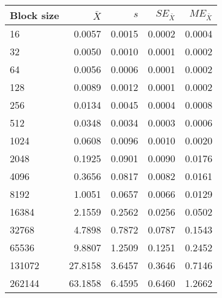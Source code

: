 \begin{tabular}{lrrrr}\toprule
{\small Block size} & $\bar{X}$ & $s$ & $SE_{\bar{X}}$ & $ME_{\bar{X}}$ \\\midrule
16 & 0.0057 & 0.0015 & 0.0002 & 0.0004\\
32 & 0.0050 & 0.0010 & 0.0001 & 0.0002\\
64 & 0.0056 & 0.0006 & 0.0001 & 0.0002\\
128 & 0.0089 & 0.0012 & 0.0001 & 0.0002\\
256 & 0.0134 & 0.0045 & 0.0004 & 0.0008\\
512 & 0.0348 & 0.0034 & 0.0003 & 0.0006\\
1024 & 0.0608 & 0.0096 & 0.0010 & 0.0020\\
2048 & 0.1925 & 0.0901 & 0.0090 & 0.0176\\
4096 & 0.3656 & 0.0817 & 0.0082 & 0.0161\\
8192 & 1.0051 & 0.0657 & 0.0066 & 0.0129\\
16384 & 2.1559 & 0.2562 & 0.0256 & 0.0502\\
32768 & 4.7898 & 0.7872 & 0.0787 & 0.1543\\
65536 & 9.8807 & 1.2509 & 0.1251 & 0.2452\\
131072 & 27.8158 & 3.6457 & 0.3646 & 0.7146\\
262144 & 63.1858 & 6.4595 & 0.6460 & 1.2662\\
\bottomrule
\end{tabular}
